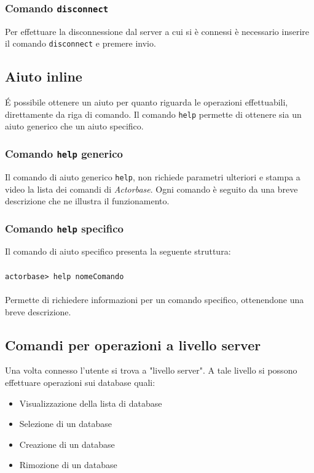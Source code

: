 \documentclass[a4paper]{article}
\begin{document}
	\subsubsection{Comando \texttt{disconnect}}
	Per effettuare la disconnessione dal server a cui si è connessi è necessario inserire il comando \texttt{disconnect} e premere invio.
	

	\subsection{Aiuto inline}
	\'E possibile ottenere un aiuto per quanto riguarda le operazioni effettuabili, direttamente da riga di comando. Il comando \texttt{help} permette di ottenere sia un aiuto generico che un aiuto specifico.
	
	\subsubsection{Comando \texttt{help} generico}
	Il comando di aiuto generico \texttt{help}, non richiede parametri ulteriori e stampa a video la lista dei comandi di \emph{Actorbase}. Ogni comando è seguito da una breve descrizione che ne illustra il funzionamento.
	
	\subsubsection{Comando \texttt{help} specifico}
	Il comando di aiuto specifico presenta la seguente struttura:
	\\ \\
	\texttt{actorbase>	help nomeComando}
	\\ \\
	Permette di richiedere informazioni per un comando specifico, ottenendone una breve descrizione.
	
	\subsection{Comandi per operazioni a livello server}
	Una volta connesso l'utente si trova a "livello server". A tale livello si possono effettuare operazioni sui database quali:
	\begin{itemize}
		\item Visualizzazione della lista di database
		\item Selezione di un database
		\item Creazione di un database
		\item Rimozione di un database
	\end{itemize}
	
\end{document}
